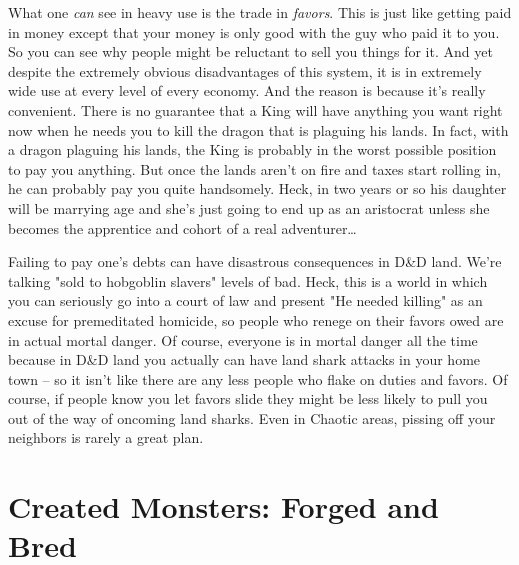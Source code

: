What one \textit{can} see in heavy use is the trade in \textit{favors}. This is just like getting paid in money except that your money is only good with the guy who paid it to you. So you can see why people might be reluctant to sell you things for it. And yet despite the extremely obvious disadvantages of this system, it is in extremely wide use at every level of every economy. And the reason is because it's really convenient. There is no guarantee that a King will have anything you want right now when he needs you to kill the dragon that is plaguing his lands. In fact, with a dragon plaguing his lands, the King is probably in the worst possible position to pay you anything. But once the lands aren't on fire and taxes start rolling in, he can probably pay you quite handsomely. Heck, in two years or so his daughter will be marrying age and she's just going to end up as an aristocrat unless she becomes the apprentice and cohort of a real adventurer\ldots

Failing to pay one's debts can have disastrous consequences in D\&D land. We're talking "sold to hobgoblin slavers" levels of bad. Heck, this is a world in which you can seriously go into a court of law and present "He needed killing" as an excuse for premeditated homicide, so people who renege on their favors owed are in actual mortal danger. Of course, everyone is in mortal danger all the time because in D\&D land you actually can have land shark attacks in your home town -- so it isn't like there are any less people who flake on duties and favors. Of course, if people know you let favors slide they might be less likely to pull you out of the way of oncoming land sharks. Even in Chaotic areas, pissing off your neighbors is rarely a great plan.


\section{Created Monsters: Forged and Bred}
\vspace*{-8pt}


